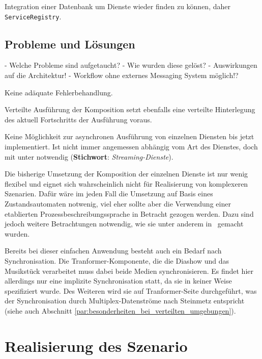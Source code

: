  Integration einer Datenbank um Dienste wieder finden zu können, daher \verb!ServiceRegistry!.

  
\subsection{Probleme und Lösungen} %
\label{sub:probleme_und_loesungen_architektur}

  - Welche Probleme sind aufgetaucht?
  - Wie wurden diese gelöst?
  - Auswirkungen auf die Architektur!
  - Workflow ohne externes Messaging System möglich!?
  
  Keine adäquate Fehlerbehandlung.
  
  Verteilte Ausführung der Komposition setzt ebenfalls eine verteilte Hinterlegung des aktuell Fortschritts der Ausführung voraus.
  
  Keine Möglichkeit zur asynchronen Ausführung von einzelnen Diensten bis jetzt implementiert. Ist nicht immer angemessen abhängig vom Art des Dienstes, doch mit unter notwendig (\textbf{Stichwort}: \emph{Streaming-Dienste}).
  
  Die bisherige Umsetzung der Komposition der einzelnen Dienste ist nur wenig flexibel und eignet sich wahrscheinlich nicht für Realisierung von komplexeren Szenarien. Dafür wäre im jeden Fall die Umsetzung auf Basis eines Zustandsautomaten notwenig, viel eher sollte aber die Verwendung einer etablierten Prozessbeschreibungssprache in Betracht gezogen werden. Dazu sind jedoch weitere Betrachtungen notwendig, wie sie unter anderem in~\citep{samma08} gemacht wurden.

  Bereits bei dieser einfachen Anwendung besteht auch ein Bedarf nach Synchronisation. Die Tranformer-Komponente, die die Diashow und das Musikstück verarbeitet muss dabei beide Medien synchronisieren. Es findet hier allerdings nur eine implizite Synchronisation statt, da sie in keiner Weise spezifiziert wurde. Des Weiteren wird sie auf Tranformer-Seite durchgeführt, was der Synchronisation durch Multiplex-Datenströme nach Steinmetz entspricht~\citep[S. 609]{multimedia_technologie} (siehe auch Abschnitt \ref{par:besonderheiten_bei_verteilten_umgebungen}).



\section{Realisierung des Szenario} %
\label{sec:realisierung_des_szenario}

